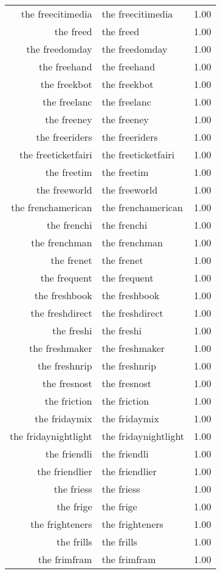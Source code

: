 \begin{table}[ht]
\begin{tabular}{rlr}
  the freecitimedia & the freecitimedia & 1.00 \\ 
  the freed & the freed & 1.00 \\ 
  the freedomday & the freedomday & 1.00 \\ 
  the freehand & the freehand & 1.00 \\ 
  the freekbot & the freekbot & 1.00 \\ 
  the freelanc & the freelanc & 1.00 \\ 
  the freeney & the freeney & 1.00 \\ 
  the freeriders & the freeriders & 1.00 \\ 
  the freeticketfairi & the freeticketfairi & 1.00 \\ 
  the freetim & the freetim & 1.00 \\ 
  the freeworld & the freeworld & 1.00 \\ 
  the frenchamerican & the frenchamerican & 1.00 \\ 
  the frenchi & the frenchi & 1.00 \\ 
  the frenchman & the frenchman & 1.00 \\ 
  the frenet & the frenet & 1.00 \\ 
  the frequent & the frequent & 1.00 \\ 
  the freshbook & the freshbook & 1.00 \\ 
  the freshdirect & the freshdirect & 1.00 \\ 
  the freshi & the freshi & 1.00 \\ 
  the freshmaker & the freshmaker & 1.00 \\ 
  the freshnrip & the freshnrip & 1.00 \\ 
  the fresnost & the fresnost & 1.00 \\ 
  the friction & the friction & 1.00 \\ 
  the fridaymix & the fridaymix & 1.00 \\ 
  the fridaynightlight & the fridaynightlight & 1.00 \\ 
  the friendli & the friendli & 1.00 \\ 
  the friendlier & the friendlier & 1.00 \\ 
  the friess & the friess & 1.00 \\ 
  the frige & the frige & 1.00 \\ 
  the frighteners & the frighteners & 1.00 \\ 
  the frills & the frills & 1.00 \\ 
  the frimfram & the frimfram & 1.00 \\ 

\end{tabular}
\end{table}
